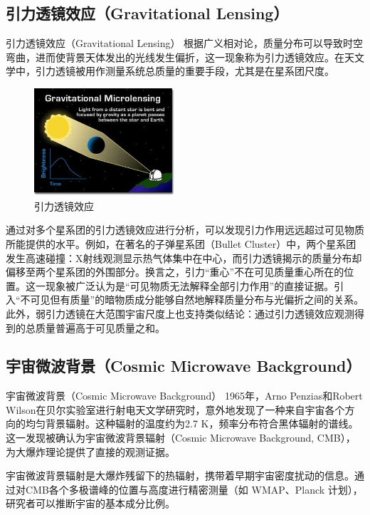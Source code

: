 \documentclass{beamer} %
\begin{document}
\subsection{引力透镜效应（Gravitational Lensing）}

\begin{frame}{引力透镜效应（Gravitational Lensing）}
根据广义相对论，质量分布可以导致时空弯曲，进而使背景天体发出的光线发生偏折，这一现象称为引力透镜效应。在天文学中，引力透镜被用作测量系统总质量的重要手段，尤其是在星系团尺度。

\begin{figure}[!htbp]
    \centering    
    \includegraphics[height=4cm]{Img/2-2.jpg}
    \caption{引力透镜效应 }
    \label{2-2}
\end{figure}
\end{frame}

\begin{frame}
通过对多个星系团的引力透镜效应进行分析，可以发现引力作用远远超过可见物质所能提供的水平。例如，在著名的子弹星系团（Bullet Cluster）中，两个星系团发生高速碰撞：X射线观测显示热气体集中在中心，而引力透镜揭示的质量分布却偏移至两个星系团的外围部分。换言之，引力“重心”不在可见质量重心所在的位置。这一现象被广泛认为是“可见物质无法解释全部引力作用”的直接证据。引入“不可见但有质量”的暗物质成分能够自然地解释质量分布与光偏折之间的关系。此外，弱引力透镜在大范围宇宙尺度上也支持类似结论：通过引力透镜效应观测得到的总质量普遍高于可见质量之和。
\end{frame}

\subsection{宇宙微波背景（Cosmic Microwave Background）}

\begin{frame}{宇宙微波背景（Cosmic Microwave Background）}
1965年，Arno Penzias和Robert Wilson在贝尔实验室进行射电天文学研究时，意外地发现了一种来自宇宙各个方向的均匀背景辐射。这种辐射的温度约为2.7 K，频率分布符合黑体辐射的谱线。这一发现被确认为宇宙微波背景辐射（Cosmic Microwave Background, CMB），为大爆炸理论提供了直接的观测证据。

宇宙微波背景辐射是大爆炸残留下的热辐射，携带着早期宇宙密度扰动的信息。通过对CMB各个多极谱峰的位置与高度进行精密测量（如 WMAP、Planck 计划），研究者可以推断宇宙的基本成分比例。
\end{frame}
\end{document}
